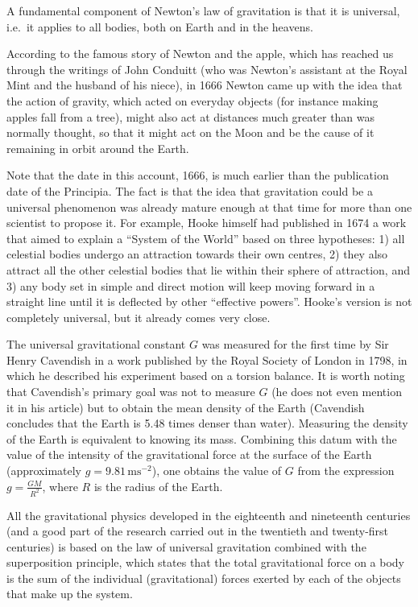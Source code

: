 \begin{points}
\item A fundamental component of Newton's law of gravitation is that it is universal, i.e.\ it applies to all bodies, both on Earth and in the heavens.

\item According to the famous story of Newton and the apple, which has reached us through the writings of John Conduitt (who was Newton's assistant at the Royal Mint and the husband of his niece), in 1666 Newton came up with the idea that the action of gravity, which acted on everyday objects (for instance making apples fall from a tree), might also act at distances much greater than was normally thought, so that it might act on the Moon and be the cause of it remaining in orbit around the Earth.

\item Note that the date in this account, 1666, is much earlier than the publication date of the Principia. The fact is that the idea that gravitation could be a universal phenomenon was already mature enough at that time for more than one scientist to propose it. For example, Hooke himself had published in 1674 a work that aimed to explain a ``System of the World'' based on three hypotheses: 1) all celestial bodies undergo an attraction towards their own centres, 2) they also attract all the other celestial bodies that lie within their sphere of attraction, and 3) any body set in simple and direct motion will keep moving forward in a straight line until it is deflected by other ``effective powers''. Hooke's version is not completely universal, but it already comes very close.

\item The universal gravitational constant $G$ was measured for the first time by Sir Henry Cavendish in a work published by the Royal Society of London in 1798, in which he described his experiment based on a torsion balance. It is worth noting that Cavendish's primary goal was not to measure $G$ (he does not even mention it in his article) but to obtain the mean density of the Earth (Cavendish concludes that the Earth is 5.48 times denser than water). Measuring the density of the Earth is equivalent to knowing its mass. Combining this datum with the value of the intensity of the gravitational force at the surface of the Earth (approximately $g=9.81\,\mathrm{ms^{-2}}$), one obtains the value of $G$ from the expression $g=\frac{GM}{R^2}$, where $R$ is the radius of the Earth.

\item All the gravitational physics developed in the eighteenth and nineteenth centuries (and a good part of the research carried out in the twentieth and twenty-first centuries) is based on the law of universal gravitation combined with the superposition principle, which states that the total gravitational force on a body is the sum of the individual (gravitational) forces exerted by each of the objects that make up the system.


\end{points}
